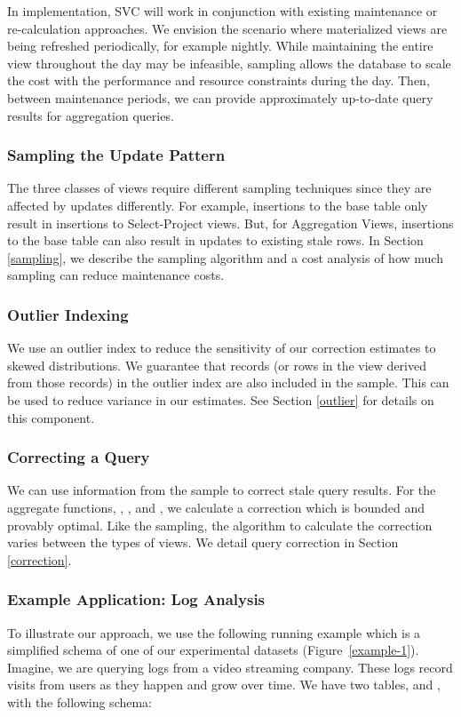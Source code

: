 In implementation, SVC will work in conjunction with existing maintenance or re-calculation approaches.
We envision the scenario where materialized views are being refreshed periodically, for example nightly.
While maintaining the entire view throughout the day may be infeasible, sampling allows the database to scale the cost with the performance and resource constraints during the day.
Then, between maintenance periods, we can provide approximately up-to-date query results for aggregation queries.

\subsubsection{Sampling the Update Pattern}
The three classes of views require different sampling techniques since they are affected by updates differently.
For example, insertions to the base table only result in insertions to Select-Project views.
But, for Aggregation Views, insertions to the base table can also result in updates to existing stale rows.
In Section \ref{sampling}, we describe the sampling algorithm and a cost analysis of how much sampling can reduce maintenance costs.

\subsubsection{Outlier Indexing}
We use an outlier index to reduce the sensitivity of our correction estimates to skewed distributions. 
We guarantee that records (or rows in the view derived from those records) 
in the outlier index are also included in the sample.
This can be used to reduce variance in our estimates.
See Section \ref{outlier} for details on this component.

\subsubsection{Correcting a Query}
We can use information from the sample to correct stale query results.
For the aggregate functions, \sumfunc, \countfunc, and \avgfunc, we calculate a correction
which is bounded and provably optimal.
Like the sampling, the algorithm to calculate the correction varies between the types of views.
We detail query correction in Section \ref{correction}.

\subsubsection{Example Application: Log Analysis}
To illustrate our approach, we use the following running example which is a 
simplified schema of one of our experimental datasets (Figure~\ref{example-1}).
Imagine, we are querying logs from a video streaming company. 
These logs record visits from users as they happen and grow over time.
We have two tables,  and , with the following schema:


